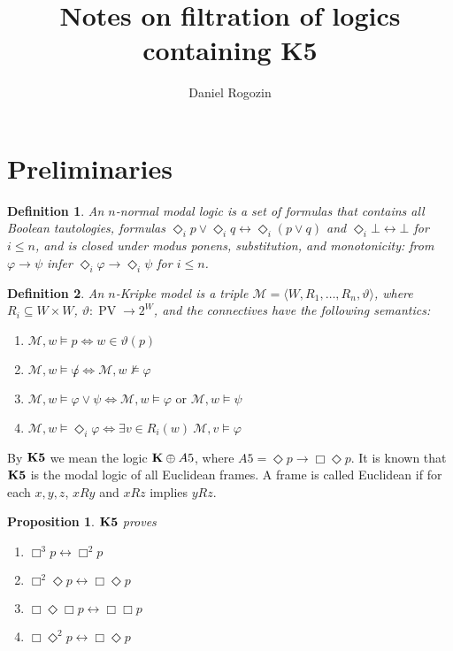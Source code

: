 \documentclass[a4paper]{article}
\author{Daniel Rogozin}
\date{}
\title{Notes on filtration of logics containing {\bf K5}}
\theoremstyle{defin}
\newtheorem{defin}{Definition}
\theoremstyle{theorem}
\theoremstyle{prop}
\newtheorem{prop}{Proposition}
\theoremstyle{lemma}
\theoremstyle{ex}
\theoremstyle{col}
\begin{document}
\maketitle

\section{Preliminaries}

\begin{defin}
  An $n$-normal modal logic is a set of formulas that contains all Boolean tautologies, formulas $\Diamond_i p \lor \Diamond_i q \leftrightarrow \Diamond_i (p \lor q)$ and $\Diamond_i \bot \leftrightarrow \bot$ for $i \leq n$, and is closed under modus ponens, substitution, and monotonicity: from $\varphi \rightarrow \psi$ infer $\Diamond_i \varphi \rightarrow \Diamond_i \psi$ for $i \leq n$.
\end{defin}

\begin{defin} An $n$-Kripke model is a triple $\mathcal{M} = \langle W, R_1, \dots, R_n, \vartheta \rangle$, where $R_i \subseteq W \times W$, $\vartheta : \operatorname{PV} \to 2^W$, and the connectives have the following semantics:

  \begin{enumerate}
    \item $\mathcal{M}, w \models p \Leftrightarrow w \in \vartheta(p)$
    \item $\mathcal{M}, w \models \not \varphi \Leftrightarrow \mathcal{M}, w \nvDash \varphi$
    \item $\mathcal{M}, w \models \varphi \lor \psi \Leftrightarrow \mathcal{M}, w \models \varphi \text{ or } \mathcal{M}, w \models \psi$
    \item $\mathcal{M}, w \models \Diamond_i \varphi \Leftrightarrow \exists v \in R_i(w) \: \mathcal{M}, v \models \varphi$
  \end{enumerate}
\end{defin}

By ${\bf K5}$ we mean the logic ${\bf K} \oplus {A5}$, where ${A5} = \Diamond p \to \Box \Diamond p$. It is known that ${\bf K5}$ is the modal logic of all Euclidean frames. A frame is called Euclidean if for each $x, y, z$, $x R y$ and $x R z$ implies $y R z$.

\begin{prop} \label{K5proves}
  ${\bf K5}$ proves
  \begin{enumerate}
    \item $\Box^3 p \leftrightarrow \Box^2 p$
    \item $\Box^2 \Diamond p \leftrightarrow \Box \Diamond p$
    \item $\Box \Diamond \Box p \leftrightarrow \Box \Box p$
    \item $\Box \Diamond^2 p \leftrightarrow \Box \Diamond p$
  \end{enumerate}
\end{prop}
\end{document}

